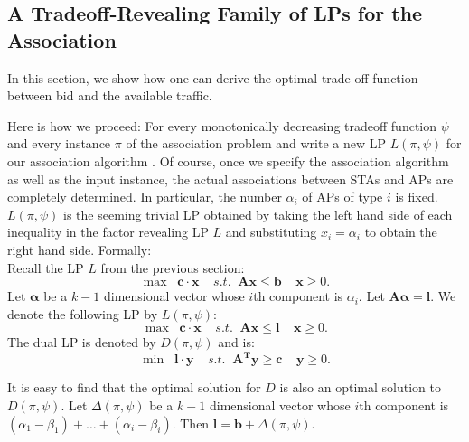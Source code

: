 \documentclass[conference]{IEEEtran}
\begin{document}
  \subsection{A Tradeoff-Revealing Family of LPs for the Association}
  In this section, we show how one can derive the optimal trade-off function between bid and the available traffic.

 Here is how we proceed: For every monotonically decreasing tradeoff function $\psi$ and every instance $\pi$ of the association problem and write a new LP $L(\pi,\psi)$ for our association algorithm .  Of course, once we specify the association algorithm as well as the input instance, the actual associations between STAs and APs are completely determined.  In particular, the number $\alpha_i$ of APs of type $i$ is fixed.  $L(\pi,\psi)$ is the seeming trivial LP obtained by taking the left hand side of each inequality in the factor revealing LP $L$ and substituting $x_i=\alpha_i$ to obtain the right hand side.  Formally:\\
  Recall the LP $L$ from the previous section:
  \begin{equation*}
    \max\;\; \bm{c}\cdot\bm{x} \;\;\;\;s.t.\;\;\bm{Ax}\leq\bm{b}\;\;\;\;\bm{x}\geq 0.
  \end{equation*}
  Let $\bm{\alpha}$ be a $k-1$ dimensional vector whose $i$th component is $\alpha_i$.  Let $\bm{A\alpha}=\bm{l}$.  We denote the following LP by $L(\pi,\psi)$:
  \begin{equation*}
    \max\;\; \bm{c}\cdot\bm{x} \;\;\;\;s.t.\;\;\bm{Ax}\leq\bm{l}\;\;\;\;\bm{x}\geq 0.
  \end{equation*}
  The dual LP is denoted by $D(\pi,\psi)$ and is:
  \begin{equation*}
    \min\;\; \bm{l}\cdot\bm{y} \;\;\;\;s.t.\;\;\bm{A^{T}y}\geq\bm{c}\;\;\;\;\bm{y}\geq 0.
  \end{equation*}

  It is easy to find that the optimal solution for $D$ is also an optimal solution to $D(\pi,\psi)$.  Let $\Delta(\pi,\psi)$ be a $k-1$ dimensional vector whose $i$th component is $(\alpha_1-\beta_1)+\ldots+(\alpha_i-\beta_i)$.  Then $ \bm{l}=\bm{b}+\Delta(\pi,\psi).$
\end{document}
